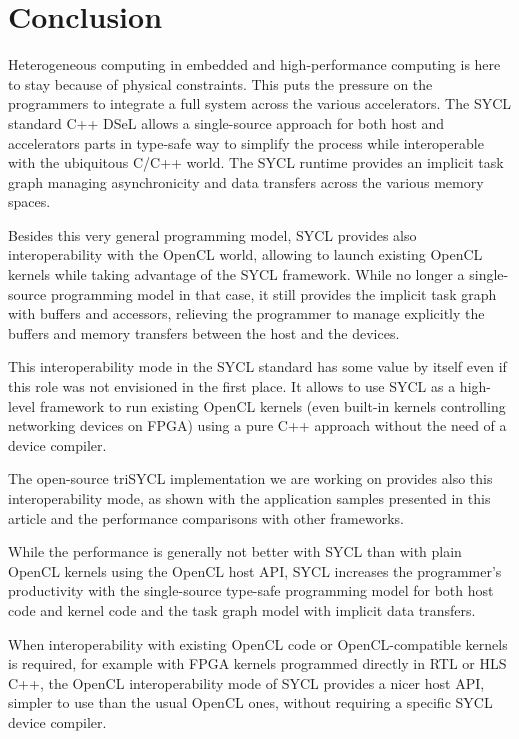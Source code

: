 \documentclass[sigplan, review, authordraft]{acmart}
\begin{document}
\section{Conclusion}
\label{sec:conclusion}

Heterogeneous computing in embedded and high-performance computing is
here to stay because of physical constraints. This puts the pressure on
the programmers to integrate a full system across the various
accelerators. The SYCL standard C++ DSeL allows a single-source
approach for both host and accelerators parts in type-safe way to
simplify the process while interoperable with the ubiquitous C/C++
world. The SYCL runtime provides an implicit task graph managing
asynchronicity and data transfers across the various memory spaces.

Besides this very general programming model, SYCL provides also
interoperability with the OpenCL world, allowing to launch existing
OpenCL kernels while taking advantage of the SYCL framework. While no
longer a single-source programming model in that case, it still
provides the implicit task graph with buffers and accessors, relieving
the programmer to manage explicitly the buffers and memory transfers
between the host and the devices.

This interoperability mode in the SYCL standard has some value by
itself even if this role was not envisioned in the first place. It
allows to use SYCL as a high-level framework to run existing OpenCL
kernels (even built-in kernels controlling networking devices on
FPGA) using a pure C++ approach without the need of a device compiler.

The open-source triSYCL implementation \cite{triSYCL} we are working
on provides also this interoperability mode, as shown with the
application samples presented in this article and the performance
comparisons with other frameworks.

While the performance is generally not better with SYCL than with
plain OpenCL kernels using the OpenCL host API, SYCL increases the
programmer's productivity with the single-source type-safe programming
model for both host code and kernel code and the task graph model with
implicit data transfers.

When interoperability with existing OpenCL code or OpenCL-compatible
kernels is required, for example with FPGA kernels programmed directly
in RTL or HLS C++, the OpenCL interoperability mode of SYCL provides a
nicer host API, simpler to use than the usual OpenCL ones, without
requiring a specific SYCL device compiler.




\end{document}
